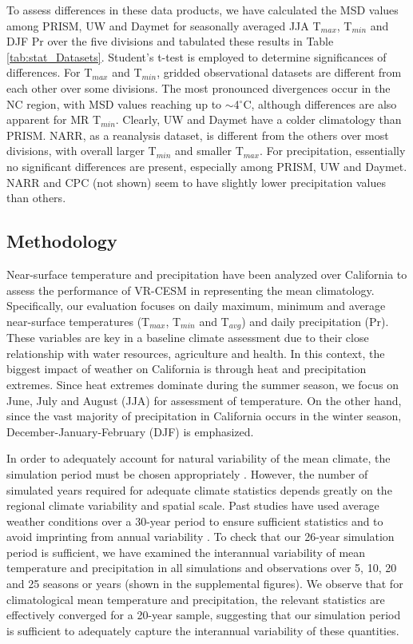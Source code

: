 \documentclass[draft,ms]{agutex}   %
\begin{document}
\begin{article}
To assess differences in these data products, we have calculated the MSD values among PRISM, UW and Daymet for seasonally averaged JJA T$_{max}$, T$_{min}$ and DJF Pr over the five divisions and tabulated these results in Table \ref{tab:stat_Datasets}. Student's t-test is employed to determine significances of differences. For T$_{max}$ and T$_{min}$, gridded observational datasets are different from each other over some divisions.  The most pronounced divergences occur in the NC region, with MSD values reaching up to $\sim$4$^\circ$C, although differences are also apparent for MR T$_{min}$. Clearly, UW and Daymet have a colder climatology than PRISM. NARR, as a reanalysis dataset, is different from the others over most divisions, with overall larger T$_{min}$ and smaller T$_{max}$. For precipitation, essentially no significant differences are present, especially among PRISM, UW and Daymet. NARR and CPC (not shown) seem to have slightly lower precipitation values than others.

\subsection{Methodology}

Near-surface temperature and precipitation have been analyzed over California to assess the performance of VR-CESM in representing the mean climatology. Specifically, our evaluation focuses on daily maximum, minimum and average near-surface temperatures (T$_{max}$, T$_{min}$ and T$_{avg}$) and daily precipitation (Pr). These variables are key in a baseline climate assessment due to their close relationship with water resources, agriculture and health. In this context, the biggest impact of weather on California is through heat and precipitation extremes. Since heat extremes dominate during the summer season, we focus on June, July and August (JJA) for assessment of temperature. On the other hand, since the vast majority of precipitation in California occurs in the winter season, December-January-February (DJF) is emphasized.  

In order to adequately account for natural variability of the mean climate, the simulation period must be chosen appropriately \citep{solomon2007climate}. However, the number of simulated years required for adequate climate statistics depends greatly on the regional climate variability and spatial scale. Past studies have used average weather conditions over a 30-year period to ensure sufficient statistics and to avoid imprinting from annual variability \citep{dinse2009climate}. To check that our 26-year simulation period is sufficient, we have examined the interannual variability of mean temperature and precipitation in all simulations and observations over 5, 10, 20 and 25 seasons or years (shown in the supplemental figures). We observe that for climatological mean temperature and precipitation, the relevant statistics are effectively converged for a 20-year sample, suggesting that our simulation period is sufficient to adequately capture the interannual variability of these quantities. 



\end{article}
\end{document}
